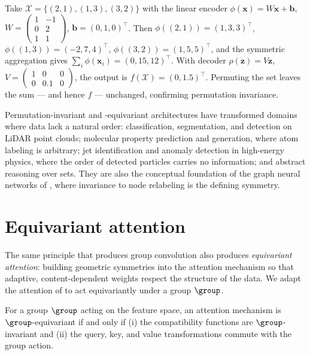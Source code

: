 \begin{example}
\label{ex:groups:deepsets-numerical}
Take $\mathcal{X} = \{(2,1),(1,3),(3,2)\}$ with the linear encoder $\phi(\mathbf{x})
= W\mathbf{x} + \mathbf{b}$, $W = \left(\begin{smallmatrix} 1 & -1 \\ 0 & 2 \\ 1 &
1 \end{smallmatrix}\right)$, $\mathbf{b} = (0,1,0)^\top$. Then $\phi((2,1)) =
(1,3,3)^\top$, $\phi((1,3)) = (-2,7,4)^\top$, $\phi((3,2)) = (1,5,5)^\top$, and
the symmetric aggregation gives $\sum_i \phi(\mathbf{x}_i) = (0,15,12)^\top$.
With decoder $\rho(\mathbf{z}) = V\mathbf{z}$, $V = \left(\begin{smallmatrix} 1 & 0
& 0 \\ 0 & 0.1 & 0 \end{smallmatrix}\right)$, the output is $f(\mathcal{X}) =
(0, 1.5)^\top$. Permuting the set leaves the sum --- and hence $f$ ---
unchanged, confirming permutation invariance.
\end{example}

Permutation-invariant and -equivariant architectures have transformed domains
where data lack a natural order: classification, segmentation, and detection on
LiDAR point clouds; molecular property prediction and generation, where atom
labeling is arbitrary; jet identification and anomaly detection in high-energy
physics, where the order of detected particles carries no information; and
abstract reasoning over sets. They are also the conceptual foundation of the
graph neural networks of , where invariance to node relabeling is
the defining symmetry.

\section{Equivariant attention}
\label{sec:groups:equivariant-attention}

The same principle that produces group convolution also produces
\emph{equivariant attention}: building geometric symmetries into the attention
mechanism so that adaptive, content-dependent weights respect the structure of
the data. We adapt the attention of  to act equivariantly under a
group $\group$.

\begin{theorem}
\label{thm:groups:equivariant-attention}
For a group $\group$ acting on the feature space, an attention mechanism is
$\group$-equivariant if and only if (i) the compatibility functions are
$\group$-invariant and (ii) the query, key, and value transformations commute
with the group action.
\end{theorem}

